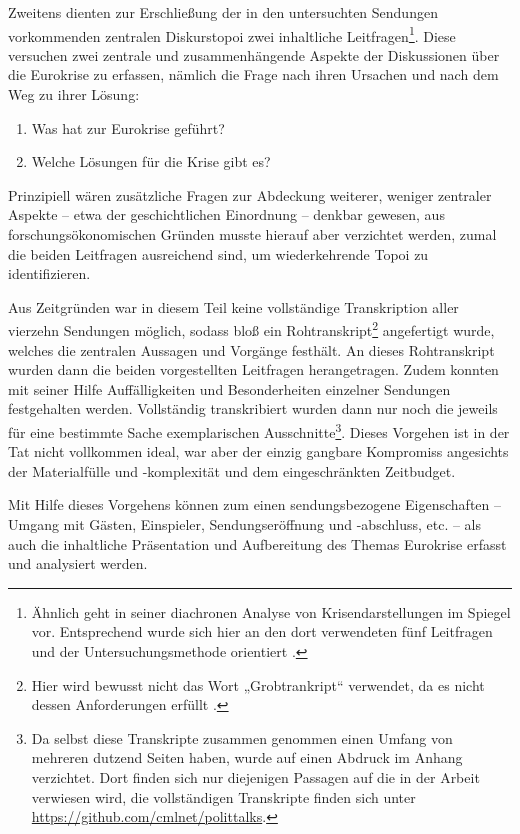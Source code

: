 Zweitens dienten zur Erschließung der in den untersuchten Sendungen vorkommenden zentralen Diskurstopoi zwei inhaltliche Leitfragen\footnote{Ähnlich geht \textcite{wengelerNochNieZuvor2010} in seiner diachronen Analyse von Krisendarstellungen im Spiegel vor. Entsprechend wurde sich hier an den dort verwendeten fünf Leitfragen und der Untersuchungsmethode orientiert \parencite[143]{wengelerNochNieZuvor2010}.}. Diese versuchen zwei zentrale und zusammenhängende Aspekte der Diskussionen über die Eurokrise zu erfassen, nämlich die Frage nach ihren Ursachen und nach dem Weg zu ihrer Lösung:

\begin{enumerate}
	\item Was hat zur Eurokrise geführt?
	\item Welche Lösungen für die Krise gibt es?
\end{enumerate}

Prinzipiell wären zusätzliche Fragen zur Abdeckung weiterer, weniger zentraler Aspekte -- etwa der geschichtlichen Einordnung -- denkbar gewesen, aus forschungsökonomischen Gründen musste hierauf aber verzichtet werden, zumal die beiden Leitfragen ausreichend sind, um wiederkehrende Topoi zu identifizieren.

Aus Zeitgründen war in diesem Teil keine vollständige Transkription aller vierzehn Sendungen möglich, sodass bloß ein Rohtranskript\footnote{Hier wird bewusst nicht das Wort „Grobtrankript“ verwendet, da es nicht dessen Anforderungen erfüllt \parencite[83ff.]{dittmarTranskriptionLeitfadenMit2004}.} angefertigt wurde, welches die zentralen Aussagen und Vorgänge festhält. An dieses Rohtranskript wurden dann die beiden vorgestellten Leitfragen herangetragen. Zudem konnten mit seiner Hilfe Auffälligkeiten und Besonderheiten einzelner Sendungen festgehalten werden. Vollständig transkribiert wurden dann nur noch die jeweils für eine bestimmte Sache exemplarischen Ausschnitte\footnote{Da selbst diese Transkripte zusammen genommen einen Umfang von mehreren dutzend Seiten haben, wurde auf einen Abdruck im Anhang verzichtet. Dort finden sich nur diejenigen Passagen auf die in der Arbeit verwiesen wird, die vollständigen Transkripte finden sich unter \url{https://github.com/cmlnet/polittalks}.}. Dieses Vorgehen ist in der Tat nicht vollkommen ideal, war aber der einzig gangbare Kompromiss angesichts der Materialfülle und -komplexität und dem eingeschränkten Zeitbudget.

Mit Hilfe dieses Vorgehens können zum einen sendungsbezogene Eigenschaften – Umgang mit Gästen, Einspieler, Sendungseröffnung und -abschluss, etc. – als auch die inhaltliche Präsentation und Aufbereitung des Themas Eurokrise erfasst und analysiert werden.

